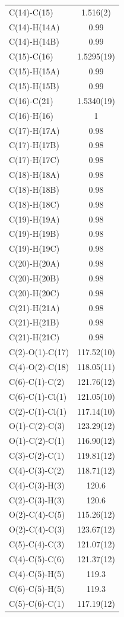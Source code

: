 \begin{center}
{\begin{supertabular}{p{1.5in}c}
C(14)-C(15) &1.516(2)\\
C(14)-H(14A) &0.99\\
C(14)-H(14B) &0.99\\
C(15)-C(16) &1.5295(19)\\
C(15)-H(15A) &0.99\\
C(15)-H(15B) &0.99\\
C(16)-C(21) &1.5340(19)\\
C(16)-H(16) &1\\
C(17)-H(17A) &0.98\\
C(17)-H(17B) &0.98\\
C(17)-H(17C) &0.98\\
C(18)-H(18A) &0.98\\
C(18)-H(18B) &0.98\\
C(18)-H(18C) &0.98\\
C(19)-H(19A) &0.98\\
C(19)-H(19B) &0.98\\
C(19)-H(19C) &0.98\\
C(20)-H(20A) &0.98\\
C(20)-H(20B) &0.98\\
C(20)-H(20C) &0.98\\
C(21)-H(21A) &0.98\\
C(21)-H(21B) &0.98\\
C(21)-H(21C) &0.98\\
C(2)-O(1)-C(17)&117.52(10)\\
C(4)-O(2)-C(18)&118.05(11)\\
C(6)-C(1)-C(2)&121.76(12)\\
C(6)-C(1)-Cl(1)&121.05(10)\\
C(2)-C(1)-Cl(1)&117.14(10)\\
O(1)-C(2)-C(3)&123.29(12)\\
O(1)-C(2)-C(1)&116.90(12)\\
C(3)-C(2)-C(1)&119.81(12)\\
C(4)-C(3)-C(2)&118.71(12)\\
C(4)-C(3)-H(3)&120.6\\
C(2)-C(3)-H(3)&120.6\\
O(2)-C(4)-C(5)&115.26(12)\\
O(2)-C(4)-C(3)&123.67(12)\\
C(5)-C(4)-C(3)&121.07(12)\\
C(4)-C(5)-C(6)&121.37(12)\\
C(4)-C(5)-H(5)&119.3\\
C(6)-C(5)-H(5)&119.3\\
C(5)-C(6)-C(1)&117.19(12)\\

\end{supertabular}}
\end{center}
